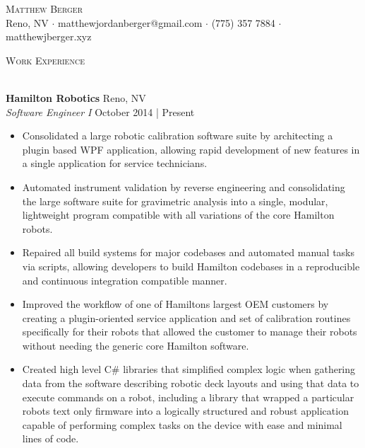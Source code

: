 \documentclass[a4paper]{article}
\newcommand{\lineunder} {
    \vspace*{-8pt} \\
    \hspace*{-18pt} \hrulefill \\
}
\newcommand{\header} [1] {
    {\hspace*{-18pt}\vspace*{6pt} \textsc{#1}}
    \vspace*{-6pt} \lineunder
}
\begin{document}
\vspace*{-40pt}

    

\vspace*{-10pt}
\begin{center}
	{\Huge \scshape {Matthew Berger}}\\
	Reno, NV $\cdot$ matthewjordanberger@gmail.com $\cdot$ (775) 357 7884 $\cdot$ matthewjberger.xyz\\
\end{center}

\header{Work Experience}
\vspace{1mm}

\textbf{Hamilton Robotics} \hfill Reno, NV\\
\textit{Software Engineer I} \hfill October 2014 | Present\\
\vspace{-1mm}
\begin{itemize} \itemsep 1pt
	\item Consolidated a large robotic calibration software suite by architecting a plugin based WPF application, allowing rapid development of new features in a single application for service technicians.
	\item Automated instrument validation by reverse engineering and consolidating the large software suite for gravimetric analysis into a single, modular, lightweight program compatible with all variations of the core Hamilton robots.
	\item Repaired all build systems for major codebases and automated manual tasks via scripts, allowing developers to build Hamilton codebases in a reproducible and continuous integration compatible manner.
	\item Improved the workflow of one of Hamilton\textquotesingle{}s largest OEM customers by creating a plugin-oriented service application and set of calibration routines specifically for their robots that allowed the customer to manage their robots without needing the generic core Hamilton software.
	\item Created high level C\# libraries that simplified complex logic when gathering data from the software describing robotic deck layouts and using that data to execute commands on a robot, including a library that wrapped a particular robot\textquotesingle{}s text only firmware into a logically structured and robust application capable of performing complex tasks on the device with ease and minimal lines of code.
\end{itemize}
\end{document}
